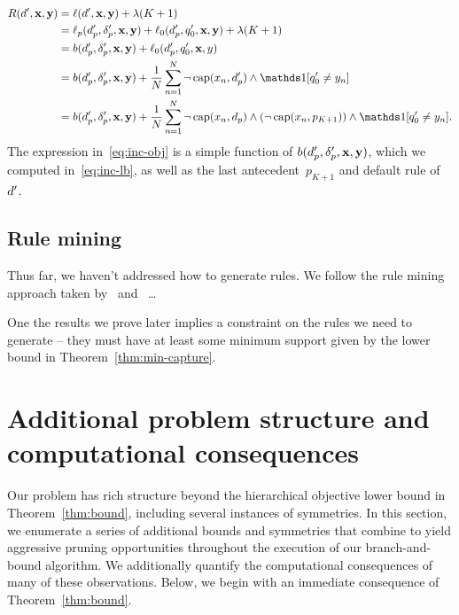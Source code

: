 \begin{align}
\Obj(\RL', \x, \y) &= \Loss(\RL', \x, \y) + \Reg (K + 1) \nn \\
&= \Loss_p(\Prefix', \Labels', \x, \y) + \Loss_0(\Prefix', \Default', \x, \y) + \Reg(K + 1) \nn \\
&= b(\Prefix', \Labels', \x, \y) + \Loss_0(\Prefix', \Default', \x, y) \nn \\
&= b(\Prefix', \Labels', \x, \y) + \frac{1}{N}\sum_{n=1}^N \neg\, \Cap(x_n, \Prefix') \wedge
  \one [q'_0 \neq y_n] \nn \\
&= b(\Prefix', \Labels', \x, \y) + \frac{1}{N}\sum_{n=1}^N \neg\, \Cap(x_n, \Prefix) \wedge
  (\neg\, \Cap(x_n, p_{K+1})) \wedge \one [q'_0 \neq y_n].
\label{eq:inc-obj}
\end{align}
The expression in~\eqref{eq:inc-obj} is a simple function of
$b(d_p', \delta_p', \mathbf{x}, \mathbf{y})$, which we computed in~\eqref{eq:inc-lb},
as well as the last antecedent~$p_{K+1}$ and default rule of~${d}'$.

\subsection{Rule mining}
\label{sec:rule-mining}

Thus far, we haven't addressed how to generate rules.
%
We follow the rule mining approach taken by~\citet{LethamRuMcMa15}
and~\citet{YangRuSe16} \dots

One the results we prove later implies a constraint on the rules
we need to generate -- they must have at least some minimum support
given by the lower bound in Theorem~\ref{thm:min-capture}.

\section{Additional problem structure and computational consequences}

Our problem has rich structure beyond the hierarchical objective lower bound
in Theorem~\ref{thm:bound}, including several instances of symmetries.
%
In this section, we enumerate a series of additional bounds and
symmetries that combine to yield aggressive pruning opportunities
throughout the execution of our branch-and-bound algorithm.
%
We additionally quantify the computational consequences of many
of these observations.
%
Below, we begin with an immediate consequence of Theorem~\ref{thm:bound}.

